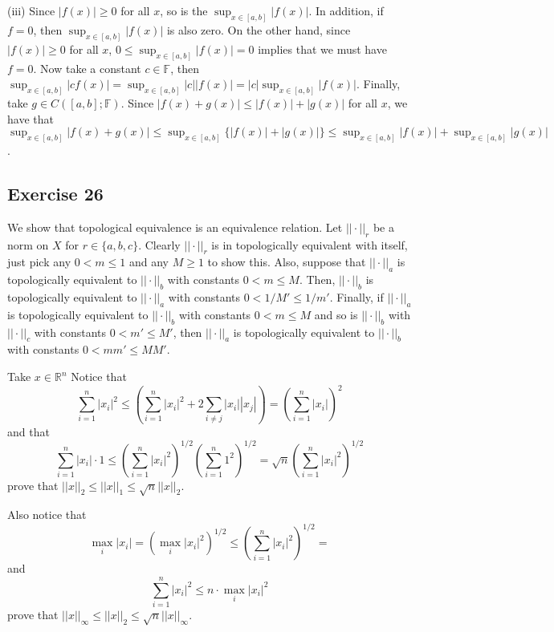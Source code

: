 \documentclass[11.5pt, letterpaper, bibtotoc,
    tablecaptionabove, figurecaptionabove]{article}
\begin{document}
(iii)
Since $|f(x)|\geq 0$ for all $x$, so is the $\sup_{x\in[a, b]}|f(x)|$.
In addition, if $f=0$, then $\sup_{x\in[a, b]}|f(x)|$ is also zero.
On the other hand, since $|f(x)|\geq 0$ for all $x$, $0\leq\sup_{x\in[a, b]}|f(x)|=0$
implies that we must have $f=0$.
Now take a constant $c\in\mathbb F$, then
$\sup_{x\in[a, b]}|cf(x)|=\sup_{x\in[a, b]}|c||f(x)|=|c|\sup_{x\in[a, b]}|f(x)|$.
Finally, take $g\in C([a, b];\mathbb F)$.
Since $|f(x)+g(x)|\leq|f(x)|+|g(x)|$ for all $x$, we have that
$\sup_{x\in[a, b]}|f(x)+g(x)|\leq\sup_{x\in[a, b]}\{|f(x)|+|g(x)|\}
\leq\sup_{x\in[a, b]}|f(x)|+\sup_{x\in[a, b]}|g(x)|$.

\subsection*{Exercise 26}
We show that topological equivalence is an equivalence relation.
Let $||\cdot||_r$ be a norm on $X$ for $r\in\{a, b, c\}$.
Clearly $||\cdot||_r$ is in topologically equivalent with itself,
just pick any $0<m\leq 1$ and any $M\geq 1$ to show this.
Also, suppose that $||\cdot||_a$ is topologically equivalent to $||\cdot||_b$
with constants $0<m\leq M$.
Then, $||\cdot||_b$ is topologically equivalent to $||\cdot||_a$ with constants
$0<1/M'\leq 1/m'$.
Finally, if $||\cdot||_a$ is topologically equivalent to $||\cdot||_b$ with constants
$0<m\leq M$ and so is $||\cdot||_b$ with $||\cdot||_c$ with constants $0<m'\leq M'$,
then $||\cdot||_a$ is topologically equivalent to $||\cdot||_b$ with constants
$0<mm'\leq MM'$.

Take $x\in\mathbb R^n$
Notice that
\begin{equation*}
    \sum_{i=1}^n|x_i|^2\leq
    \left(\sum_{i=1}^n|x_i|^2+2\sum_{i\neq j}|x_i||x_j|\right)=
    \left(\sum_{i=1}^n|x_i|\right)^2
\end{equation*}
and that
\begin{equation*}
    \sum_{i=1}^n|x_i|\cdot1\leq
    \left(\sum_{i=1}^n|x_i|^2\right)^{1/2}\left(\sum_{i=1}^n1^2\right)^{1/2}=
    \sqrt{n}\left(\sum_{i=1}^n|x_i|^2\right)^{1/2}
\end{equation*}
prove that $||x||_2\leq||x||_1\leq\sqrt{n}||x||_2$.

Also notice that
\begin{equation*}
    \max_{i}|x_i|=\left(\max_i|x_i|^2\right)^{1/2}\leq
    \left(\sum_{i=1}^n|x_i|^2\right)^{1/2}=
\end{equation*}
and
\begin{equation*}
    \sum_{i=1}^n|x_i|^2\leq n\cdot\max_i|x_i|^2
\end{equation*}
prove that $||x||_\infty\leq||x||_2\leq \sqrt{n}||x||_\infty$.
\end{document}
